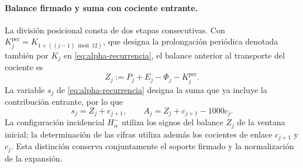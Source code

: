 \paragraph{Balance firmado y suma con cociente entrante.}
\label{ampl-alfa-z-s-aclaracion}
La división posicional consta de dos etapas consecutivas. Con
\(K_j^{\mathrm{per}}=K_{1+((j-1)\bmod12)}\), que designa la
prolongación periódica denotada también por \(K_j\) en
\eqref{eq:alpha-recurrencia}, el balance anterior al transporte del
cociente es
\[
 Z_j:=P_j+E_j-\Phi_j-K_j^{\mathrm{per}}.
\]
La variable $s_j$ de \eqref{eq:alpha-recurrencia} designa la suma que ya
incluye la contribución entrante, por lo que
\[
 s_j=Z_j+c_{j+1},\qquad
 A_j=Z_j+c_{j+1}-1000c_j.
\]
La configuración incidencial
$H^-_\alpha$ utiliza los signos del balance $Z_j$ de la ventana inicial;
la determinación de las cifras utiliza además los cocientes de enlace
$c_{j+1}$ y $c_j$. Esta distinción conserva conjuntamente el soporte
firmado y la normalización de la expansión.
